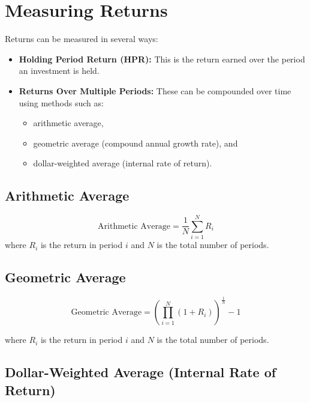 \documentclass[
]{book}
\providecommand{\tightlist}{%
  \setlength{\itemsep}{0pt}\setlength{\parskip}{0pt}}
\begin{document}
\hypertarget{measuring-returns}{%
\section{Measuring Returns}\label{measuring-returns}}

Returns can be measured in several ways:

\begin{itemize}
\tightlist
\item
  \textbf{Holding Period Return (HPR):} This is the return earned over the period an investment is held.
\item
  \textbf{Returns Over Multiple Periods:} These can be compounded over time using methods such as:

  \begin{itemize}
  \tightlist
  \item
    arithmetic average,
  \item
    geometric average (compound annual growth rate), and
  \item
    dollar-weighted average (internal rate of return).
  \end{itemize}
\end{itemize}

\hypertarget{arithmetic-average}{%
\subsection{Arithmetic Average}\label{arithmetic-average}}

\[ \text{Arithmetic Average} = \frac{1}{N} \sum_{i=1}^{N} R_i \]
where \(R_i\) is the return in period \(i\) and \(N\) is the total number of periods.

\hypertarget{geometric-average}{%
\subsection{Geometric Average}\label{geometric-average}}

\[ \text{Geometric Average} = \left( \prod_{i=1}^{N} (1 + R_i) \right)^{\frac{1}{N}} - 1 \]

where \(R_i\) is the return in period \(i\) and \(N\) is the total number of periods.

\hypertarget{dollar-weighted-average-internal-rate-of-return}{%
\subsection{Dollar-Weighted Average (Internal Rate of Return)}\label{dollar-weighted-average-internal-rate-of-return}}
\end{document}
